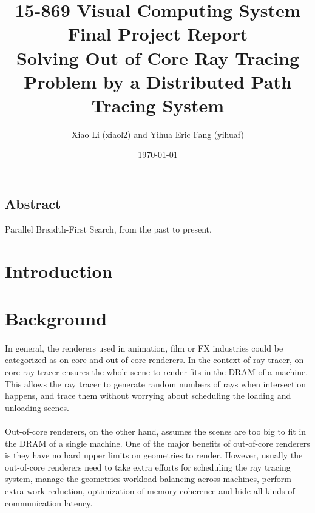 \documentclass[a4paper, oneside, 10pt]{article}
\title{{\bf 15-869 Visual Computing System Final Project Report \\
 \large Solving Out of Core Ray Tracing Problem by a Distributed Path Tracing System}} %
\author{Xiao Li (xiaol2) and Yihua Eric Fang (yihuaf)}
\date{\today} %
\begin{document}
\maketitle
\thispagestyle{empty}
\newpage
\begin{center}
\vspace*{\fill}
\section*{Abstract}
Parallel Breadth-First Search, from the past to present.\\
\vspace*{\fill}
\newpage
\end{center}

\tableofcontents
\newpage

\section{Introduction}
\section{Background}
\paragraph{} In general, the renderers used in animation, film or FX industries could be categorized as on-core and out-of-core renderers.  In the context of ray tracer, on core ray tracer ensures the whole scene to render fits in the DRAM of a machine. This allows the ray tracer to generate random numbers of rays when intersection happens, and trace them without worrying about scheduling the loading and unloading scenes. 

\paragraph{} Out-of-core renderers, on the other hand, assumes the scenes are too big to fit in the DRAM of a single machine. One of the major benefits of out-of-core renderers is they have no hard upper limits on geometries to render. However, usually the out-of-core renderers need to take extra efforts for scheduling the ray tracing system, manage the geometries workload balancing across machines, perform extra work reduction, optimization of memory coherence and hide all kinds of communication latency. 
\end{document}
